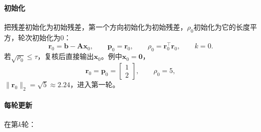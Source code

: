 \paragraph{初始化}
把残差初始化为初始残差，第一个方向初始化为初始残差，$\rho_0$初始化为它的长度平方，轮次初始化为$0$：
\[
 \bm r_0=\bm b-\bm A\bm x_0,\qquad \bm p_0=\bm r_0,\qquad \rho_0=\bm r_0^\top\bm r_0,\qquad k=0 .
\]
若$\sqrt{\rho_0}\le\tau$，复核后直接输出$\bm x_0$。例中$\bm x_0=\bm 0$，
\[
 \bm r_0=\bm p_0=\begin{bmatrix}1\\2\end{bmatrix},\qquad \rho_0=5,
\]
$\lVert\bm r_0\rVert_2=\sqrt5\approx2.24$，进入第一轮。

\paragraph{每轮更新}
在第$k$轮：
